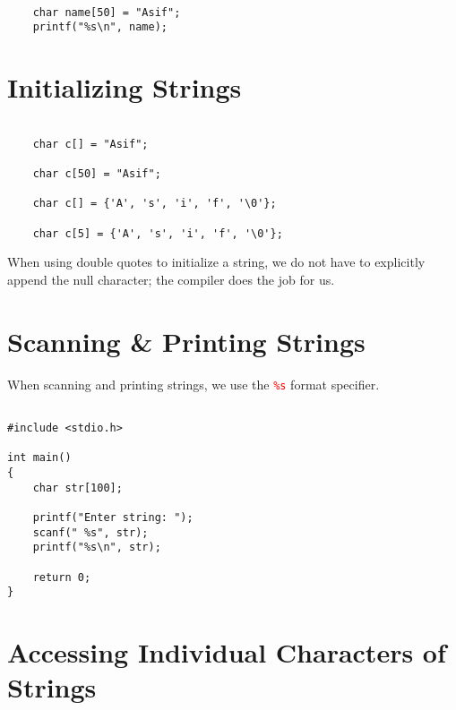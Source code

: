 \documentclass[12pt]{article}
\begin{document}
\begin{verbatim}

    char name[50] = "Asif";
    printf("%s\n", name);

\end{verbatim}

\section*{Initializing Strings}

\begin{verbatim}

    char c[] = "Asif";

    char c[50] = "Asif";

    char c[] = {'A', 's', 'i', 'f', '\0'};

    char c[5] = {'A', 's', 'i', 'f', '\0'};

\end{verbatim}

\vspace{1cm}
\noindent When using double quotes to initialize a string, we do not have to explicitly append the null character; the compiler does the job for us. \\



\newpage
{}
\section*{Scanning \& Printing Strings}

When scanning and printing strings, we use the \textcolor{red}{\texttt{\%s}} format specifier.

\begin{verbatim}

#include <stdio.h>

int main()
{
    char str[100];

    printf("Enter string: ");
    scanf(" %s", str);
    printf("%s\n", str);

    return 0;
}

\end{verbatim}

{}
\section*{Accessing Individual Characters of Strings}
\end{document}
